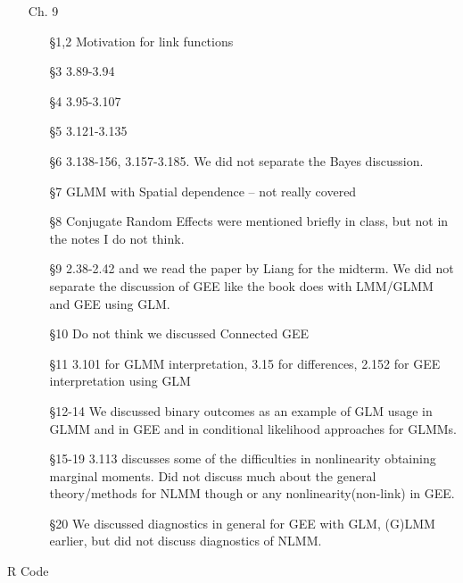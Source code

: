 \documentclass[11pt]{article}
\begin{document}
\begin{enumerate}
\begin{itemize}
\begin{itemize}
				\end{itemize}
			\item[Ch. 9]
				\begin{itemize}
					\item[\S 1,2] Motivation for link functions
					\item[\S 3] 3.89-3.94
					\item[\S 4] 3.95-3.107
					\item[\S 5] 3.121-3.135
					\item[\S 6] 3.138-156, 3.157-3.185. We did not separate the Bayes discussion.
					\item[\S 7] GLMM with Spatial dependence -- not really covered
					\item[\S 8] Conjugate Random Effects were mentioned briefly in class, but not in the notes I do not think.
					\item[\S 9] 2.38-2.42 and we read the paper by Liang for the midterm. We did not separate the discussion of GEE like the book does with LMM/GLMM and GEE using GLM.
					\item[\S 10] Do not think we discussed Connected GEE
					\item[\S 11] 3.101 for GLMM interpretation, 3.15 for differences, 2.152 for GEE interpretation using GLM
					\item[\S 12-14] We discussed binary outcomes as an example of GLM usage in GLMM and in GEE and in conditional likelihood approaches for GLMMs.
					\item[\S 15-19] 3.113 discusses some of the difficulties in nonlinearity obtaining marginal moments. Did not discuss much about the general theory/methods for NLMM though or any nonlinearity(non-link) in GEE.
					\item[\S 20] We discussed diagnostics in general for GEE with GLM, (G)LMM earlier, but did not discuss diagnostics of NLMM.
				\end{itemize}
		\end{itemize}
\end{enumerate}
\newpage
R Code
\end{document}
